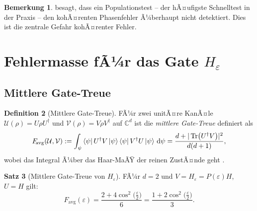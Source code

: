 ﻿\documentclass[11pt,a4paper]{article}
\theoremstyle{definition}
\newtheorem{theorem}{Satz}[section]
\newtheorem{definition}[theorem]{Definition}
\newtheorem{remark}[theorem]{Bemerkung}
\newcommand{\eps}{\varepsilon}
\newcommand{\Heps}{H_{\!\varepsilon}}
\newcommand{\Fav}{F_{\!\mathrm{avg}}}
\newcommand{\C}{\mathbb{C}}
\begin{document}
\begin{remark}
   besagt, dass ein Populationstest -- der hÃ¤ufigste
  Schnelltest in der Praxis -- den kohÃ¤renten Phasenfehler Ã¼berhaupt nicht
  detektiert.  Dies ist die zentrale Gefahr kohÃ¤renter Fehler.
\end{remark}

\section{Fehlermasse fÃ¼r das Gate $\Heps$}
\label{sec:metrics}

\subsection{Mittlere Gate-Treue}
\label{subsec:avg_fidelity}

\begin{definition}[Mittlere Gate-Treue]
  FÃ¼r zwei unitÃ¤re KanÃ¤le $\mathcal{U}(\rho) = U\rho U^\dagger$ und
  $\mathcal{V}(\rho) = V\rho V^\dagger$ auf $\C^d$ ist die
  \emph{mittlere Gate-Treue} definiert als
  \begin{equation}
    F_{\!\mathrm{avg}}(\mathcal{U},\mathcal{V})
    := \int_{\psi} \bra{\psi}U^\dagger V \ket{\psi}\bra{\psi}V^\dagger U\ket{\psi}\,\mathrm{d}\psi
    = \frac{d + |\Tr(U^\dagger V)|^2}{d(d+1)},
    \label{eq:Favg_def}
  \end{equation}
  wobei das Integral Ã¼ber das Haar-MaÃŸ der reinen ZustÃ¤nde geht \cite{Nielsen2002}.
\end{definition}

\begin{theorem}[Mittlere Gate-Treue von $\Heps$]
\label{thm:favg}
  FÃ¼r $d=2$ und $V = \Heps = P(\eps)H$, $U = H$ gilt:
  \begin{equation}
    \Fav(\eps) = \frac{2 + 4\cos^2\!\bigl(\tfrac{\eps}{2}\bigr)}{6}
    = \frac{1 + 2\cos^2\!\bigl(\tfrac{\eps}{2}\bigr)}{3}.
    \label{eq:Favg_result}
  \end{equation}
\end{theorem}
\end{document}
